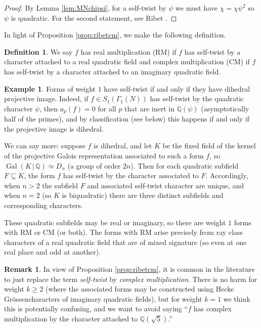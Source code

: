 \documentclass[11pt]{amsart}
\numberwithin{equation}{subsection}
\theoremstyle{plain}
\theoremstyle{definition}
\newtheorem{defn}[equation]{Definition}
\newtheorem{rmk}[equation]{Remark}
\newtheorem{exm}[equation]{Example}
\newcommand{\Q}{\mathbb{Q}}
\newcommand{\defi}[1]{\textsf{#1}} 	%
\DeclareMathOperator{\Gal}{Gal}
\begin{document}
\begin{proof}
By Lemma \ref{lem:MNchipsi}, for a self-twist by $\psi$ we must have $\chi=\chi\psi^2$ so $\psi$ is quadratic.  For the second statement, see Ribet \cite[Theorem (4.5)]{Ribet:galreps}.
\end{proof}

In light of Proposition \ref{prop:ribetcm}, we make the following definition.

\begin{defn}
We say $f$ has \defi{real multiplication (RM)} if $f$ has self-twist by a character attached to a real quadratic field and \defi{complex multiplication (CM)} if $f$ has self-twist by a character attached to an imaginary quadratic field.
\end{defn}

\begin{exm}
Forms of weight $1$ have self-twist if and only if they have dihedral projective image.  Indeed, if $f \in S_1(\Gamma_1(N))$ has self-twist by the quadratic character $\psi$, then $a_p(f)=0$ for all $p$ that are inert in $\Q(\psi)$ (asymptotically half of the primes), and by classification (see below) this happens if and only if the projective image is dihedral.  

We can say more: suppose $f$ is dihedral, and let $K$ be the fixed field of the kernel of the projective Galois representation associated to such a form $f$, so $\Gal(K\,|\,\Q) \simeq D_n$ (a group of order $2n$).  Then for each quadratic subfield $F \subseteq K$, the form $f$ has self-twist by the character associated to $F$.  Accordingly, when $n>2$ the subfield $F$ and associated self-twist character are unique, and when $n=2$ (so $K$ is biquadratic) there are three distinct subfields and corresponding characters.  

These quadratic subfields may be real or imaginary, so there are weight $1$ forms with RM or CM (or both).  The forms with RM arise precisely from ray class characters of a real quadratic field that are of mixed signature (so even at one real place and odd at another).  
\end{exm}

\begin{rmk}
In view of Proposition \ref{prop:ribetcm}, it is common in the literature to just replace the term \emph{self-twist} by \emph{complex multiplication}.  There is no harm for weight $k \geq 2$ (where the associated forms may be constructed using Hecke Gr\"ossencharacters of imaginary quadratic fields), but for weight $k=1$ we think this is potentially confusing, and we want to avoid saying ``$f$ has complex multiplication by the character attached to $\Q(\sqrt{5})$.''
\end{rmk}
\end{document}
